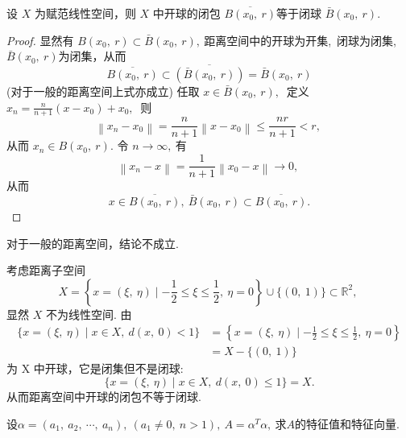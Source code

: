 	\newpage
	\begin{theorem}
		设 $ X$  为赋范线性空间，则 $ X $ 中开球的闭包  $\overline{B\left(x_{0},\  r\right)}  $等于闭球 $ \bar{B}\left(x_{0},\  r\right) .$
	\end{theorem}
	\begin{proof}
		显然有  $B\left(x_{0},\  r\right) \subset \bar{B}\left(x_{0},\  r\right),\ $距离空间中的开球为开集,\ 闭球为闭集,\  $ \bar{B}\left(x_{0},\  r\right)  $为闭集，从而
		$$\overline{B\left(x_{0},\  r\right)} \subset \overline{\left(\bar{B}\left(x_{0},\  r\right)\right)}=\bar{B}\left(x_{0},\  r\right)$$
		(对于一般的距离空间上式亦成立)
		任取 $ x \in \bar{B}\left(x_{0},\  r\right) ,\ $ 定义  $x_{n}=\frac{n}{n+1}\left(x-x_{0}\right)+x_{0} ,\ $ 则
		$$\left\|x_{n}-x_{0}\right\|=\frac{n}{n+1}\left\|x-x_{0}\right\| \leq \frac{n r}{n+1}<r,\ $$
		从而 $ x_{n} \in B\left(x_{0},\  r\right) .$ 令  $n \rightarrow \infty ,\  $有
		$$\left\|x_{n}-x\right\|=\frac{1}{n+1}\left\|x_{0}-x\right\| \rightarrow 0,\ $$
		从而  $$x \in \overline{B\left(x_{0},\  r\right)},\  \bar{B}\left(x_{0},\  r\right) \subset \overline{B\left(x_{0},\  r\right)} .$$
	\end{proof}
	\begin{note}
		对于一般的距离空间，结论不成立.
		\begin{example}
			考虑距离子空间
			$$X=\left\{x=(\xi,\  \eta) \mid-\frac{1}{2} \leq \xi \leq \frac{1}{2},\  \eta=0\right\} \cup\{(0,\ 1)\} \subset \mathbb{R}^{2},\ $$
			显然 $ X $ 不为线性空间. 由
			$$\begin{aligned}
				\{x=(\xi,\  \eta) \mid x \in X,\  d(x,\  0)<1\} & =\left\{x=(\xi,\  \eta) \mid-\frac{1}{2} \leq \xi \leq \frac{1}{2},\  \eta=0\right\} \\
				& =X-\{(0,\ 1)\}
			\end{aligned}$$
			为  X  中开球，它是闭集但不是闭球:
			$$\{x=(\xi,\  \eta) \mid x \in X,\  d(x,\  0) \leq 1\}=X .$$
			从而距离空间中开球的闭包不等于闭球.
		\end{example}
	\end{note}
	\newpage
	\begin{problem}
		设$\alpha=(a_1,\ a_2,\ \cdots,\ a_n),\ (a_1\neq 0,\ n>1),\ A=\alpha^T\alpha,\ $求$A$的特征值和特征向量.
	\end{problem}
